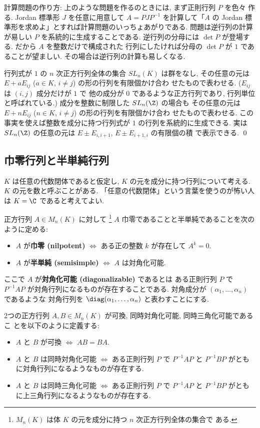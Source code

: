 \documentclass[12pt,twoside]{jarticle}
\begin{document}
\medskip
\noindent
計算問題の作り方: 上のような問題を作るのときには, まず正則行列 $P$ を色々
作る.  Jordan 標準形 $J$ を任意に用意して $A=PJP^{-1}$ を計算して「$A$ の 
Jordan 標準形を求めよ」とすれば計算問題のいっちょあがりである. 
問題は逆行列の計算が易しい $P$ を系統的に生成することである.  
逆行列の分母には $\det P$ が登場する.  だから $A$ を整数だけで構成された
行列にしたければ分母の $\det P$ が $1$ であることが望ましい.  
その場合は逆行列の計算も易しくなる.  

行列式が $1$ の $n$ 次正方行列全体の集合 $SL_n(K)$ は群をなし, 
その任意の元は $E+a E_{ij}$ ($a\in K$, $i\ne j$) の形の行列を有限個かけ合わ
せたもので表わせる.  ($E_{ij}$ は $(i,j)$ 成分だけが $1$ で
他の成分が $0$ であるような正方行列であり, 行列単位と呼ばれている.)
成分を整数に制限した $SL_n(\Z)$ の場合も
その任意の元は $E+n E_{ij}$ ($n\in K$, $i\ne j$) の形の行列を有限個かけ合わ
せたもので表わせる.  
この事実を使えば整数を成分に持つ行列式が $1$ の行列を系統的に生成できる.
実は $SL_n(\Z)$ の任意の元は $E\pm E_{i,i+1}$, $E\pm E_{i+1,i}$ の有限個の積
で表示できる. 
\qed


\subsection{巾零行列と半単純行列}
\label{sec:nilpotent-semisimple}

$K$ は任意の代数閉体であると仮定し, $K$ の元を成分に持つ行列について考える.
$K$ の元を数と呼ぶことがある. 「任意の代数閉体」という言葉を使うのが怖い人
は $K=\C$ であると考えてよい.

正方行列 $A\in M_n(K)$ に対して%
\footnote{$M_n(K)$ は体 $K$ の元を成分に持つ $n$ 次正方行列全体の集合で
ある.} $A$ 巾零であることと半単純であることを次のように定める:
\begin{itemize}
\item $A$ が{\bf 巾零 (nilpotent)} $\iff$ ある正の整数 $k$ が存在して $A^k=0$.
\item $A$ が{\bf 半単純 (semisimple)} $\iff$ $A$ は対角化可能.
\end{itemize}
ここで $A$ が{\bf 対角化可能 (diagonalizable)} であるとは
ある正則行列 $P$ で $P^{-1}AP$ が対角行列になるものが存在することである.
対角成分が $(\alpha_1,\dots,\alpha_n)$ であるような
対角行列を $\diag(\alpha_1,\dots,\alpha_n)$ と表わすことにする.

2つの正方行列 $A,B\in M_n(K)$ が可換, 同時対角化可能, 同時三角化可能であるこ
とを以下のように定義する:
\begin{itemize}
\item $A$ と $B$ が可換 $\iff$ $AB=BA$.
\item $A$ と $B$ は同時対角化可能 $\iff$ ある正則行列 $P$ で $P^{-1}AP$ 
  と $P^{-1}BP$ がともに対角行列になるようなものが存在する.
\item $A$ と $B$ は同時三角化可能 $\iff$ ある正則行列 $P$ で $P^{-1}AP$ 
  と $P^{-1}BP$ がともに上三角行列になるようなものが存在する.
\end{itemize}
\end{document}
